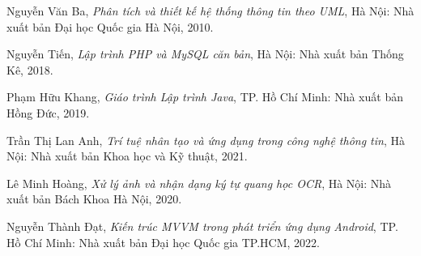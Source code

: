 \begin{enumerate}[label={[\arabic*]},leftmargin=1.2cm,itemsep=6pt,topsep=0pt]
    \item Nguyễn Văn Ba, \textit{Phân tích và thiết kế hệ thống thông tin theo UML}, Hà Nội: Nhà xuất bản Đại học Quốc gia Hà Nội, 2010.

    \item Nguyễn Tiến, \textit{Lập trình PHP và MySQL căn bản}, Hà Nội: Nhà xuất bản Thống Kê, 2018.

    \item Phạm Hữu Khang, \textit{Giáo trình Lập trình Java}, TP. Hồ Chí Minh: Nhà xuất bản Hồng Đức, 2019.

    \item Trần Thị Lan Anh, \textit{Trí tuệ nhân tạo và ứng dụng trong công nghệ thông tin}, Hà Nội: Nhà xuất bản Khoa học và Kỹ thuật, 2021.

    \item Lê Minh Hoàng, \textit{Xử lý ảnh và nhận dạng ký tự quang học OCR}, Hà Nội: Nhà xuất bản Bách Khoa Hà Nội, 2020.

    \item Nguyễn Thành Đạt, \textit{Kiến trúc MVVM trong phát triển ứng dụng Android}, TP. Hồ Chí Minh: Nhà xuất bản Đại học Quốc gia TP.HCM, 2022.
\end{enumerate}
